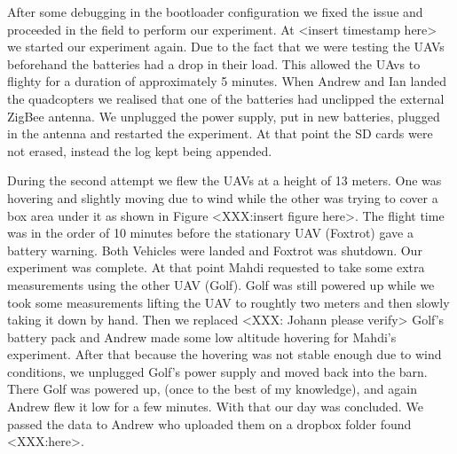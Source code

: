 After some debugging in the bootloader configuration we fixed the issue and
proceeded in the field to perform our experiment. At <insert timestamp here> we
started our experiment again. Due to the fact that we were testing the UAVs
beforehand the batteries had a drop in their load. This allowed the UAvs to
flighty for a duration of approximately 5 minutes. When Andrew and Ian landed
the quadcopters we realised that one of the batteries had unclipped the external
ZigBee antenna. We unplugged the power supply, put in new batteries, plugged in
the antenna and restarted the experiment. At that point the SD cards were not
erased, instead the log kept being appended.

During the second attempt we flew the UAVs at a height of 13 meters. One was
hovering and slightly moving due to wind while the other was trying to cover a
box area under it as shown in Figure <XXX:insert figure here>. The flight time
was in the order of 10 minutes before the stationary UAV (Foxtrot) gave a
battery warning. Both Vehicles were landed and Foxtrot was shutdown. Our
experiment was complete. At that point Mahdi requested to take some extra
measurements using the other UAV (Golf). Golf was still powered up while we took
some measurements lifting the UAV to roughtly two meters and then slowly taking
it down by hand. Then we replaced <XXX: Johann please verify> Golf's battery
pack and Andrew made some low altitude hovering for Mahdi's experiment. After
that because the hovering was not stable enough due to wind conditions, we
unplugged Golf's power supply and moved back into the barn. There Golf was
powered up, (once to the best of my knowledge), and again Andrew flew it low for
a few minutes. With that our day was concluded. We passed the data to Andrew
who uploaded them on a dropbox folder found <XXX:here>.



